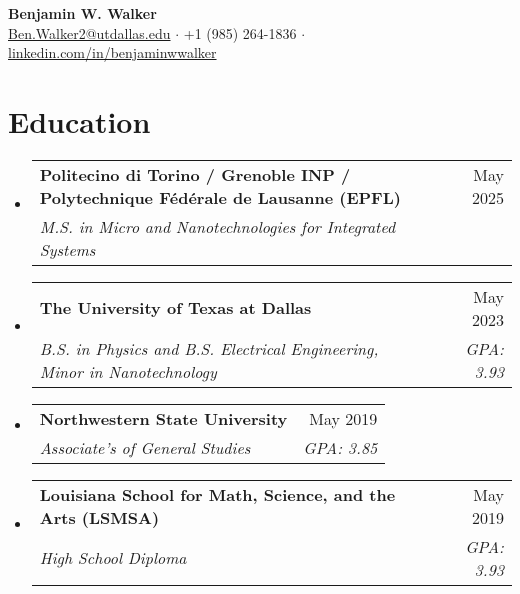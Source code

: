 \documentclass[letterpaper,11pt]{article}
\makeatletter
\newcommand{\resumeSubheading}[4]{
  \vspace{-2pt}\item
    \begin{tabular*}{0.97\textwidth}[t]{l@{\extracolsep{\fill}}r}
      \textbf{#1} & #2 \\
      \textit{\small#3} & \textit{\small #4} \\
    \end{tabular*}\vspace{-7pt}
}
\newcommand{\resumeSubHeadingListStart}{\begin{itemize}[leftmargin=0.15in, label={}]}
\newcommand{\resumeSubHeadingListEnd}{\end{itemize}}
\makeatother
\begin{document}
\begin{center}
    \textbf{\Large Benjamin W. Walker} \\ \vspace{5pt}
    \href{mailto:Ben.Walker2@utdallas.edu}{{Ben.Walker2@utdallas.edu}} 
    \hspace{1 pt} $\cdot$ \hspace{1 pt}
    +1 (985) 264-1836
    \hspace{1 pt} $\cdot$ \hspace{1 pt}
    \href{https://www.linkedin.com/in/benjaminwwalker/}{{linkedin.com/in/benjaminwwalker}}
    \vspace{-10pt}
\end{center}

\vspace{-10pt}


\section{Education}
  \resumeSubHeadingListStart
  \resumeSubheading
      {Politecino di Torino / Grenoble INP / Polytechnique Fédérale de Lausanne (EPFL)}{May 2025}
      {M.S. in Micro and Nanotechnologies for Integrated Systems}{}
    \resumeSubheading
      {The University of Texas at Dallas}{May 2023}
      {B.S. in Physics and B.S. Electrical Engineering, Minor in Nanotechnology}{GPA: 3.93}
    \resumeSubheading
      {Northwestern State University}{May 2019}
      {Associate's of General Studies}{GPA: 3.85}
    \resumeSubheading
    {Louisiana School for Math, Science, and the Arts \normalfont(LSMSA)}{May 2019}
    {High School Diploma}{GPA: 3.93}
  \resumeSubHeadingListEnd
\end{document}
